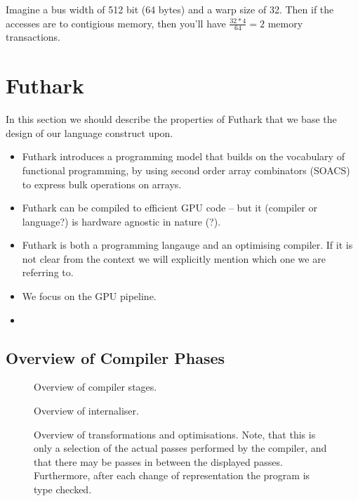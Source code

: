 Imagine a bus width of 512 bit (64 bytes) and a warp size of
32. Then if the accesses are to contigious memory, then
you'll have $\frac{32*4}{64} = 2$ memory transactions.


\section{Futhark}
\label{sec:futhark}

In this section we should describe the properties of Futhark
that we base the design of our language construct upon.
\begin{itemize}
  \item Futhark introduces a programming model that builds
    on the vocabulary of functional programming, by using
    second order array combinators (SOACS) to express bulk
    operations on arrays.

  \item Futhark can be compiled to efficient GPU code -- but
    it (compiler or language?) is hardware agnostic in
    nature (?).

  \item Futhark is both a programming langauge and an
    optimising compiler. If it is not clear from the context
    we will explicitly mention which one we are referring
    to.

  \item We focus on the GPU pipeline.

  \item
\end{itemize}
%


\subsection{Overview of Compiler Phases}

%
\begin{figure}
\begin{center}

\end{center}
\caption{Overview of compiler stages.}
\label{fig:compiler_overview}
\end{figure}
%
%
\begin{figure}
\begin{center}

\end{center}
\caption{Overview of internaliser.}
\label{fig:internaliser}
\end{figure}
%
%
\begin{figure}
\begin{center}

\end{center}
\caption{Overview of transformations and
  optimisations. Note, that this is only a selection of the
  actual passes performed by the compiler, and that there
  may be passes in between the displayed
  passes. Furthermore, after each change of representation
  the program is type checked.}
\label{fig:passes}
\end{figure}
%


